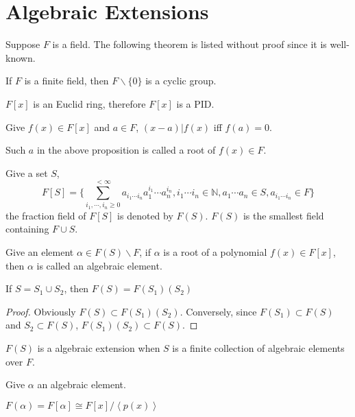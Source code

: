 \section{Algebraic Extensions}
\begin{remark}
Suppose $F$ is a field. The following theorem is listed without proof since it is well-known.
\end{remark}
\begin{proposition}
    If $F$ is a finite field, then $F\backslash\{0\}$ is a cyclic group.
\end{proposition}
\begin{theorem}
        $F[x]$ is an Euclid ring, therefore $F[x]$ is a PID.
\end{theorem}
\begin{proposition}
    Give $f(x)\in F[x]$ and $a\in F$, $(x-a)|f(x)$ iff $f(a)=0$.
\end{proposition}
\begin{remark}
    Such $a$ in the above proposition is called a root of $f(x)\in F$.
\end{remark}
\begin{definition}
    Give a set $S$, 
    $$F[S]=\{\sum_{i_1,\cdots,i_n\ge 0}^{<\infty}a_{i_1\cdots i_n} a_1^{i_1}\cdots a_n^{i_n}, i_1\cdots i_n\in\mathbb{N},a_1\cdots a_n\in S, a_{i_1\cdots i_n}\in F\}$$
    the fraction field of $F[S]$ is denoted by $F(S)$. $F(S)$ is the smallest field containing $F\cup S$. 
\end{definition}
\begin{remark}
    Give an element $\alpha\in F(S)\backslash F$, if $\alpha$ is a root of a polynomial $f(x)\in F[x]$, then $\alpha$ is called an algebraic element.
\end{remark}
\begin{proposition}
    If $S=S_1\cup S_2$, then $F(S)=F(S_1)(S_2)$
\end{proposition}
\begin{proof}
    Obviously $F(S)\subset F(S_1)(S_2)$. Conversely, since $F(S_1)\subset F(S)$ and $S_2\subset F(S)$, $F(S_1)(S_2)\subset F(S)$.
\end{proof}
\begin{definition}
    $F(S)$ is a algebraic extension when $S$ is a finite collection of algebraic elements over $F$.
\end{definition}
\begin{remark}
    Give $\alpha$ an algebraic element.
\end{remark}
\begin{proposition}
    $F(\alpha)=F[\alpha]\cong F[x]/\left<p(x)\right>$
\end{proposition}
